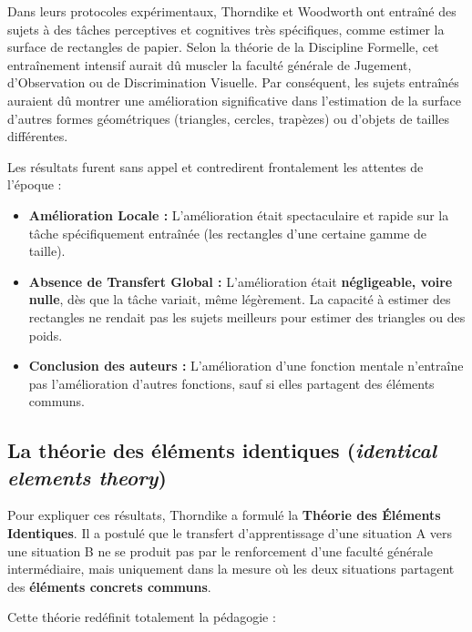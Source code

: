 Dans leurs protocoles expérimentaux, Thorndike et Woodworth ont entraîné des sujets à des tâches
perceptives et cognitives très spécifiques, comme estimer la surface de rectangles de papier. Selon
la théorie de la Discipline Formelle, cet entraînement intensif aurait dû \og muscler\fg{} la
faculté générale de Jugement, d'Observation ou de Discrimination Visuelle. Par conséquent, les
sujets entraînés auraient dû montrer une amélioration significative dans l'estimation de la surface
d'autres formes géométriques (triangles, cercles, trapèzes) ou d'objets de tailles différentes.

Les résultats furent sans appel et contredirent frontalement les attentes de l'époque :

\begin{itemize}\item \textbf{Amélioration Locale :} L'amélioration était spectaculaire et rapide sur la tâche spécifiquement entraînée (les rectangles d'une certaine gamme de taille).\item \textbf{Absence de Transfert Global :} L'amélioration était \textbf{négligeable, voire nulle}, dès que la tâche variait, même légèrement. La capacité à estimer des rectangles ne rendait pas les sujets meilleurs pour estimer des triangles ou des poids.\cite{II-1-1-ref9}\item \textbf{Conclusion des auteurs :} \og L'amélioration d'une fonction mentale n'entraîne pas l'amélioration d'autres fonctions, sauf si elles partagent des éléments communs.\fg{}\end{itemize}

\subsection{La théorie des éléments identiques (\textit{identical elements theory})}

Pour expliquer ces résultats, Thorndike a formulé la \textbf{Théorie des Éléments Identiques}. Il a
postulé que le transfert d'apprentissage d'une situation A vers une situation B ne se produit pas
par le renforcement d'une \og faculté\fg{} générale intermédiaire, mais uniquement dans la mesure où
les deux situations partagent des \textbf{éléments concrets communs}.\cite{II-1-1-ref9}

Cette théorie redéfinit totalement la pédagogie :

